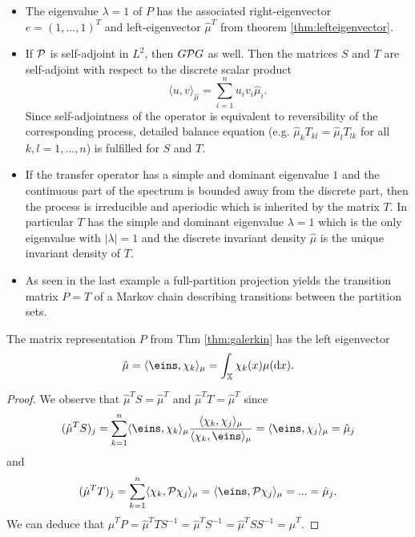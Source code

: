 \begin{itemize}
\item The eigenvalue $\lambda = 1$ of $P$ has the associated right-eigenvector $e = (1,\dots,1)^T$ and left-eigenvector $\hat{\mu}^T$ from theorem \ref{thm:lefteigenvector}.
\item If $\mathcal{P}$ is self-adjoint in $L^2$, then $G\mathcal{P} G$ as well. Then the matrices $S$ and $T$ are self-adjoint with respect to the discrete scalar product 
\begin{equation*}
\langle u, v \rangle_{\hat{\mu}} = \sum_{i=1}^n u_i v_i \hat{\mu}_i.
\end{equation*}
Since self-adjointness of the operator is equivalent to reversibility of the corresponding process, detailed balance equation (e.g. $\hat{\mu}_k T_{kl} = \hat{\mu}_l T_{lk}$ for all $k,l =1,\dots, n$) is fulfilled for $S$ and $T$.
\item If the transfer operator has a simple and dominant eigenvalue $1$ and the continuous part of the spectrum is bounded away from the discrete part, then the process is irreducible and aperiodic which is inherited by the matrix $T$. In particular $T$ has the simple and dominant eigenvalue $\lambda=1$ which is the only eigenvalue with $|\lambda|=1$ and the discrete invariant density $\hat{\mu}$ is the unique invariant density of $T$.
\item As seen in the last example a full-partition projection yields the transition matrix $P=T$ of a Markov chain describing transitions between the partition sets.
\end{itemize}

\begin{thm}
\label{thm:lefteigenvector}
The matrix representation $P$ from Thm \ref{thm:galerkin} has the left eigenvector
\begin{equation*}
\hat{\mu} = \langle \eins, \chi_k \rangle_\mu = \int_\X \chi_k(x) \mu(\diff x).
\end{equation*}
\end{thm}

\begin{proof}
We observe that $\hat{\mu}^T S = \hat{\mu}^T$ and $\hat{\mu}^T T = \hat{\mu}^T$ since
\begin{equation*}
(\hat{\mu}^T S)_j = \sum_{k=1}^n  \langle \eins, \chi_k \rangle_\mu \frac{\langle \chi_k, \chi_j \rangle_\mu}{\langle \chi_k, \eins \rangle_\mu}
= \langle \eins, \chi_j \rangle_\mu = \hat{\mu}_j
\end{equation*}
and
\begin{equation*}
(\hat{\mu}^T T)_j = \sum_{k=1}^n \langle \chi_k, \Pcal \chi_j \rangle_\mu = \langle \eins, \Pcal \chi_j \rangle_\mu
= ... = \hat{\mu}_j.
\end{equation*}
We can deduce that $\hat{\mu}^T P = \hat{\mu}^T TS^{-1} = \hat{\mu}^T S^{-1} = \hat{\mu}^T SS^{-1} = \hat{\mu}^T$.
\end{proof}

